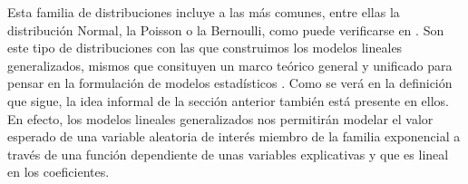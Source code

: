 
{\color{Aquamarine}Esta familia de distribuciones incluye a las más comunes, entre ellas la distribución Normal, la Poisson o la Bernoulli, como puede verificarse en \textcite[52-53]{Nieto16}.} Son este tipo de distribuciones con las que construimos los modelos lineales generalizados, mismos que consituyen un marco teórico general y unificado para pensar en la formulación de modelos estadísticos \parencites{Dobson01}{Regueiro12}. Como se verá en la definición que sigue, la idea informal de la sección anterior también está presente en ellos. En efecto, los modelos lineales generalizados nos permitirán modelar el valor esperado de una variable aleatoria de interés miembro de la familia exponencial a través de una función dependiente de unas variables explicativas y que es lineal en los coeficientes.

